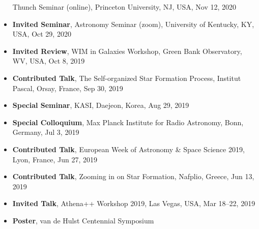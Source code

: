 \documentclass[11pt,letterpaper,roman]{moderncv}        %
\begin{document}
\begin{itemize}
  Thunch Seminar (online), Princeton University, NJ, USA, Nov 12, 2020
\item \textbf{Invited Seminar},
  Astronomy Seminar (zoom), University of Kentucky, KY, USA, Oct 29, 2020
\item \textbf{Invited Review},
  WIM in Galaxies Workshop, Green Bank Observatory, WV, USA, Oct 8, 2019
\item \textbf{Contributed Talk},
  The Self-organized Star Formation Process, Institut Pascal, Orsay, France, Sep 30, 2019
\item \textbf{Special Seminar},
  KASI, Daejeon, Korea, Aug 29, 2019
\item \textbf{Special Colloquium},
  Max Planck Institute for Radio Astronomy, Bonn, Germany, Jul 3, 2019
\item \textbf{Contributed Talk},
  European Week of Astronomy \& Space Science 2019, Lyon, France, Jun 27, 2019
\item \textbf{Contributed Talk},
  Zooming in on Star Formation, Nafplio, Greece, Jun 13, 2019
\item \textbf{Invited Talk},
  Athena++ Workshop 2019, Las Vegas, USA, Mar 18--22, 2019
\item \textbf{Poster},
  van de Hulst Centennial Symposium %

\end{itemize}
\end{document}

